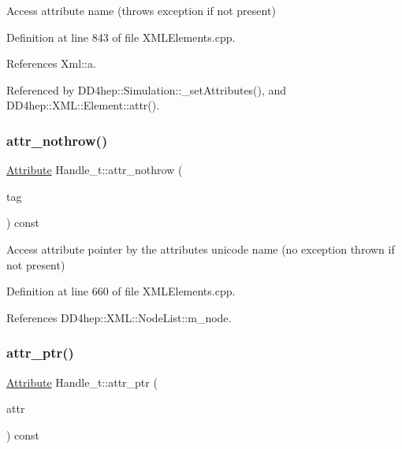 Access attribute name (throws exception if not present) 



Definition at line 843 of file X\+M\+L\+Elements.\+cpp.



References Xml\+::a.



Referenced by D\+D4hep\+::\+Simulation\+::\+\_\+set\+Attributes(), and D\+D4hep\+::\+X\+M\+L\+::\+Element\+::attr().

\hypertarget{class_d_d4hep_1_1_x_m_l_1_1_handle__t_a4d1c61fccb563349e94b1f3f2ebcbf2d}{}\label{class_d_d4hep_1_1_x_m_l_1_1_handle__t_a4d1c61fccb563349e94b1f3f2ebcbf2d} 
\subsubsection{\texorpdfstring{attr\+\_\+nothrow()}{attr\_nothrow()}}
{\footnotesize\ttfamily \hyperlink{namespace_d_d4hep_1_1_x_m_l_a5c19b7116be99d69b4b22d911357baaf}{Attribute} Handle\+\_\+t\+::attr\+\_\+nothrow (\begin{DoxyParamCaption}\item[{const \hyperlink{namespace_d_d4hep_1_1_x_m_l_a09e5d9cc86ed782f6826dfe0778c1815}{Xml\+Char} $\ast$}]{tag }\end{DoxyParamCaption}) const}



Access attribute pointer by the attribute\textquotesingle{}s unicode name (no exception thrown if not present) 



Definition at line 660 of file X\+M\+L\+Elements.\+cpp.



References D\+D4hep\+::\+X\+M\+L\+::\+Node\+List\+::m\+\_\+node.

\hypertarget{class_d_d4hep_1_1_x_m_l_1_1_handle__t_a24ef9bea47f64d01510b34bbada99b47}{}\label{class_d_d4hep_1_1_x_m_l_1_1_handle__t_a24ef9bea47f64d01510b34bbada99b47} 
\subsubsection{\texorpdfstring{attr\+\_\+ptr()}{attr\_ptr()}}
{\footnotesize\ttfamily \hyperlink{namespace_d_d4hep_1_1_x_m_l_a5c19b7116be99d69b4b22d911357baaf}{Attribute} Handle\+\_\+t\+::attr\+\_\+ptr (\begin{DoxyParamCaption}\item[{const \hyperlink{namespace_d_d4hep_1_1_x_m_l_a09e5d9cc86ed782f6826dfe0778c1815}{Xml\+Char} $\ast$}]{attr }\end{DoxyParamCaption}) const}



